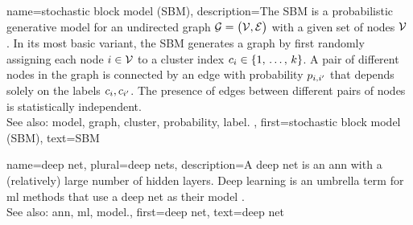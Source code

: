 {name={stochastic block model (SBM)},
	description={The SBM is a 
		probabilistic generative \gls{model} for an undirected \gls{graph} $\mathcal{G} = \big( \mathcal{V}, \mathcal{E} \big)$ 
		with a given set of nodes $\mathcal{V}$ \cite{AbbeSBM2018}. In its most basic variant, 
		the SBM generates a \gls{graph} by first randomly assigning each node $i \in \mathcal{V}$ to 
		a \gls{cluster} index $c_{i} \in \{1, \,\ldots, \,k\}$. A pair of different nodes in the 
		\gls{graph} is connected by an edge with \gls{probability} $p_{i,i'}$ that depends 
		solely on the \glspl{label} $c_{i}, c_{i'}$. 
		The presence of edges between different pairs of 
		nodes is statistically independent.
					\\ 
		See also: \gls{model}, \gls{graph}, \gls{cluster}, \gls{probability}, \gls{label}. },
	first={stochastic block model (SBM)},
	text={SBM} 
}

{name={deep net}, plural={deep nets},
	description={A deep net is an \gls{ann} with a (relatively) large number of 
		hidden layers. Deep learning is an umbrella term for \gls{ml} methods that use a deep 
		net as their \gls{model} \cite{Goodfellow-et-al-2016}.
				\\ 
		See also: \gls{ann}, \gls{ml}, \gls{model}.},
	first={deep net},
	text={deep net} 
}

\newcommand{\gaussiancenter}{3}

